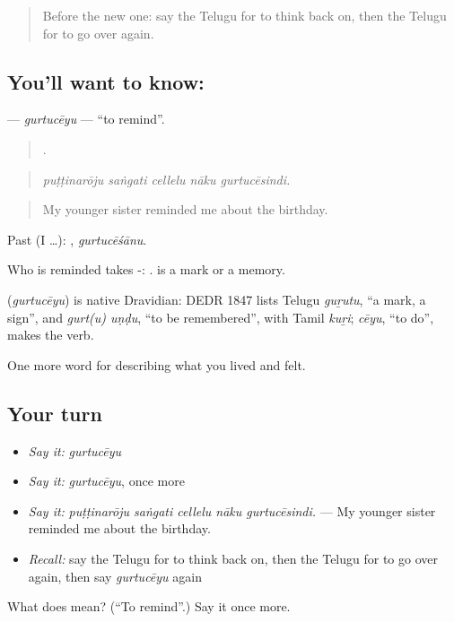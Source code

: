 \label{lesson:TE-C511-gurtuceyu}



\begin{quote}
Before the new one: say the Telugu for to think back on, then the Telugu for to go over again.
\end{quote}

\subsection*{You'll want to know: }
\textbf{} — \emph{gurtucēyu} — \textquotedblleft{}to remind\textquotedblright{}.

\begin{quote}
    .
\end{quote}

\begin{quote}
\emph{puṭṭinarōju saṅgati cellelu nāku gurtucēsindi.}
\end{quote}

\begin{quote}
My younger sister reminded me about the birthday.
\end{quote}

Past (I …): , \emph{gurtucēśānu}.

Who is reminded takes -:  .  is a mark or a memory.

\begin{cousinweb}
\textbf{} (\emph{gurtucēyu}) is native Dravidian: DEDR 1847 lists Telugu \emph{guṟutu}, \textquotedblleft{}a mark, a sign\textquotedblright{}, and \emph{gurt(u) uṇḍu}, \textquotedblleft{}to be remembered\textquotedblright{}, with Tamil \emph{kuṟi}; \emph{cēyu}, \textquotedblleft{}to do\textquotedblright{}, makes the verb.
\end{cousinweb}

\begin{grammarlens}[title={What you've built}]
One more word for describing what you lived and felt.
\end{grammarlens}

\subsection*{Your turn}
\begin{itemize}
\raggedright
  \item \emph{Say it:} \emph{gurtucēyu}
  \item \emph{Say it:} \emph{gurtucēyu}, once more
  \item \emph{Say it:} \emph{puṭṭinarōju saṅgati cellelu nāku gurtucēsindi.} — My younger sister reminded me about the birthday.
  \item \emph{Recall:} say the Telugu for to think back on, then the Telugu for to go over again, then say \emph{gurtucēyu} again
\end{itemize}

\begin{tcolorbox}[breakable,colback=teal!4,colframe=teal!35!black,title={Before you move on}]
What does  mean? (\textquotedblleft{}To remind\textquotedblright{}.) Say it once more.
\end{tcolorbox}
